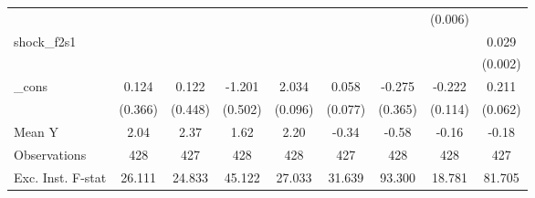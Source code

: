 {\begin{tabular}{l*{8}{c}}
            &                     &                     &                     &                     &                     &                     &     (0.006)         &                     \\
\addlinespace
shock\_f2s1  &                     &                     &                     &                     &                     &                     &                     &       0.029\sym{***}\\
            &                     &                     &                     &                     &                     &                     &                     &     (0.002)         \\
\addlinespace
\_cons      &       0.124         &       0.122         &      -1.201\sym{**} &       2.034\sym{***}&       0.058         &      -0.275         &      -0.222\sym{*}  &       0.211\sym{***}\\
            &     (0.366)         &     (0.448)         &     (0.502)         &     (0.096)         &     (0.077)         &     (0.365)         &     (0.114)         &     (0.062)         \\
\midrule
Mean Y      &        2.04         &        2.37         &        1.62         &        2.20         &       -0.34         &       -0.58         &       -0.16         &       -0.18         \\
Observations&         428         &         427         &         428         &         428         &         427         &         428         &         428         &         427         \\
Exc. Inst. F-stat&      26.111         &      24.833         &      45.122         &      27.033         &      31.639         &      93.300         &      18.781         &      81.705         \\
\bottomrule
\end{tabular}
}
